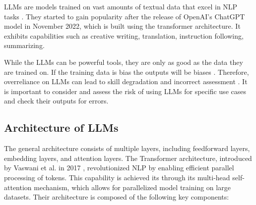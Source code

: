 LLMs are models trained on vast amounts of textual data that excel in NLP tasks \cite{10BScao2022}. They started to gain popularity after the release of OpenAI's ChatGPT model in November 2022, which is built using the transformer architecture. It exhibits capabilities such as creative writing, translation, instruction following, summarizing. 

While the LLMs can be powerful tools, they are only as good as the data they are trained on. If the training data is bias the outputs will be biases \cite{11BClusmann2023}. Therefore, overreliance on LLMs can lead to skill degradation and incorrect assessment \cite{12BLiyanage2023}. It is important to consider and assess the risk of using LLMs for specific use cases and check their outputs for errors.
\subsection{Architecture of LLMs}
The general architecture consists of multiple layers, including feedforward layers, embedding layers, and attention layers. The Transformer architecture, introduced by Vaswani et al. in 2017 \cite{13BVaswani2017}, revolutionized NLP by enabling efficient parallel processing of tokens. This capability is achieved its through its multi-head self-attention mechanism, which allows for parallelized model training on large datasets. Their architecture is composed of the following key components:

